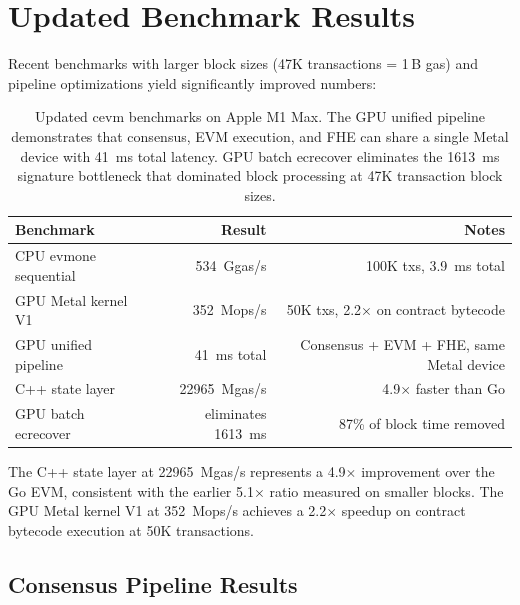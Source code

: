 \section{Updated Benchmark Results}

\label{sec:updated}

Recent benchmarks with larger block sizes (47K transactions = 1\,B gas) and pipeline
optimizations yield significantly improved numbers:

\begin{table}[h]
\centering
\small
\begin{tabular}{lrr}
\toprule
\textbf{Benchmark} & \textbf{Result} & \textbf{Notes} \\
\midrule
CPU evmone sequential       & \SI{534}{Ggas/s}     & 100K txs, \SI{3.9}{ms} total \\
GPU Metal kernel V1         & \SI{352}{Mops/s}     & 50K txs, 2.2$\times$ on contract bytecode \\
GPU unified pipeline        & \SI{41}{ms} total    & Consensus + EVM + FHE, same Metal device \\
C++ state layer             & \SI{22965}{Mgas/s}   & 4.9$\times$ faster than Go \\
GPU batch ecrecover         & eliminates \SI{1613}{ms} & 87\% of block time removed \\
\bottomrule
\end{tabular}
\caption{Updated cevm benchmarks on Apple M1 Max. The GPU unified pipeline demonstrates
that consensus, EVM execution, and FHE can share a single Metal device with \SI{41}{ms}
total latency. GPU batch ecrecover eliminates the \SI{1613}{ms} signature bottleneck that
dominated block processing at 47K transaction block sizes.}
\label{tab:updated}
\end{table}

The C++ state layer at \SI{22965}{Mgas/s} represents a 4.9$\times$ improvement over the
Go EVM, consistent with the earlier 5.1$\times$ ratio measured on smaller blocks. The
GPU Metal kernel V1 at \SI{352}{Mops/s} achieves a 2.2$\times$ speedup on contract
bytecode execution at 50K transactions.

\subsection{Consensus Pipeline Results}

